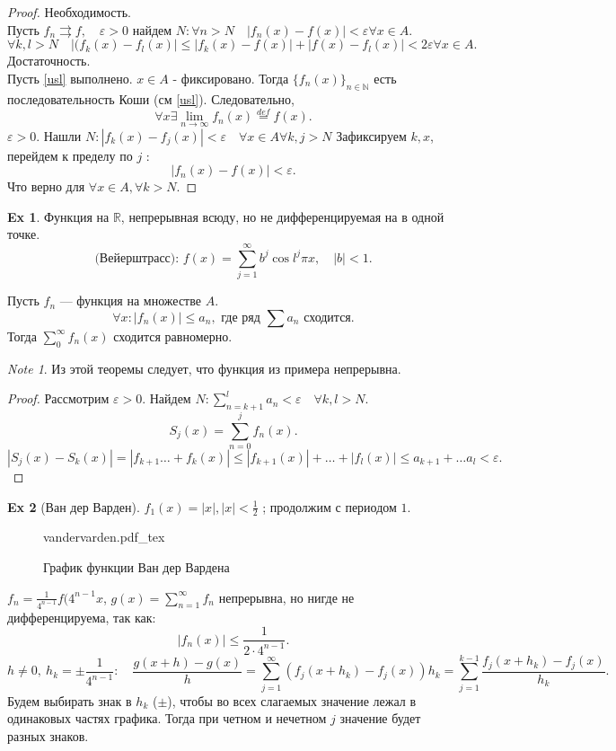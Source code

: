 \documentclass[11pt]{book}
\newcommand{\incfig}[1]{%
    \def\svgwidth{\columnwidth}
    {#1.pdf_tex}
}
\newcommand{\N}{\mathbb{N}}
\newcommand{\R}{\mathbb{R}}
\newcommand{\slim}{\sum\limits}
\renewcommand{\le}{\leqslant}
\theoremstyle{definition}
\theoremstyle{plain}
\theoremstyle{plain}
\theoremstyle{definition}
\newtheorem*{ex}{Ex}
\theoremstyle{remark}
\newtheorem*{note}{Note}
\begin{document}
\begin{proof}
    Необходимость.\\
    Пусть $f_n \rightrightarrows  f, \quad \varepsilon  >0$ найдем $N: \forall  n > N \quad |f_n(x) - f(x)| < \varepsilon  \forall x\in A$.
    \[
	\forall k, l > N \quad |(f_k(x) - f_l(x)| \le |f_k(x) -f(x)| + |f(x) - f_l(x)| < 2 \varepsilon  \forall x \in A
    .\]
    Достаточность.\\
    Пусть  \ref{usl} выполнено. $x \in A$ - фиксировано.
    Тогда $\{f_n(x)\}_{n \in  \N}$ есть последовательность Коши (см \ref{usl}). Следовательно,
    \[
	\forall  x \exists \lim_{n \to  \infty} f_n(x) \stackrel{def} = f(x)
    .\]
    $ \varepsilon  >0$. Нашли $N: |f_k(x) - f_j(x)| < \varepsilon  \quad \forall  x \in A \forall  k, j > N$
    Зафиксируем $k, x$, перейдем к пределу по $j$ :
    \[
	|f_n(x) - f(x) | < \varepsilon
    .\]
    Что верно для $ \forall  x \in  A, \forall  k > N$.
\end{proof}
\begin{ex}
    Функция на $\R$, непрерывная всюду, но не дифференцируемая на в одной точке.
    \[
	\text{(Вейерштрасс): } f(x) = \slim_{j=1}^{\infty} b^{ j} \cos l^{j} \pi x, \quad |b| < 1
    .\]
\end{ex}
\begin{thm}[Вейерштрасс]
    Пусть $f_n$ --- функция на множестве $A$.
    \[
	\forall  x : |f_n(x)| \le a_n, \text{ где ряд } \slim a_n \text{ сходится}
    .\]
    Тогда $\slim_0^{\infty} f_n(x) $ сходится равномерно.
\end{thm}
\begin{note}
    Из этой теоремы следует, что функция из примера непрерывна.
\end{note}
\begin{proof}
    Рассмотрим $ \varepsilon  > 0$. Найдем $N: \slim_{n=k+1}^{l} a_n < \varepsilon  \quad \forall  k, l > N$.
    \[
	S_j(x) = \slim_{n=0}^{j}f_n(x)
    .\]
    \[
	|S_j(x) - S_k(x)| = | f_{k+1} \ldots + f_k(x)| \le  |f_{k+1}(x)| + \ldots  + |f_l(x)| \le a_{k+1} + \ldots a_l < \varepsilon
    .\]
\end{proof}
\begin{ex}[Ван дер Варден]
    $f_1(x) =
    |x|,  |x| < \frac{1}{2} $ ; продолжим с периодом $1$.
    \begin{figure}[h]
	\centering
	\incfig{vandervarden}
	\caption{График функции Ван дер Вардена}
	\label{fig:vandervarden}
    \end{figure}
    $f_n = \frac{1}{4^{n-1}}f(4^{n-1}x$, $g(x) = \slim_{n=1}^{\infty} f_n$ непрерывна, но нигде не дифференцируема, так как:
    \[
	|f_n(x) | \le \frac{1}{2 \cdot 4^{n-1}}
    .\]
    \[
	h \ne 0, ~ h_k = \pm \frac{1}{4^{n-1}}: \quad \frac{g(x + h) - g(x)}{h} = \slim_{j=1}^{\infty} (f_j(x + h_k) - f_j(x))h_k = \slim_{j=1}^{k-1} \frac{f_j(x + h_k) - f_j(x)}{h_k}
    .\]
    Будем выбирать знак  в $h_k$ ($\pm$), чтобы во всех слагаемых значение лежал в одинаковых частях графика. Тогда при четном и нечетном $j$ значение будет разных знаков.
\end{ex}
\end{document}
